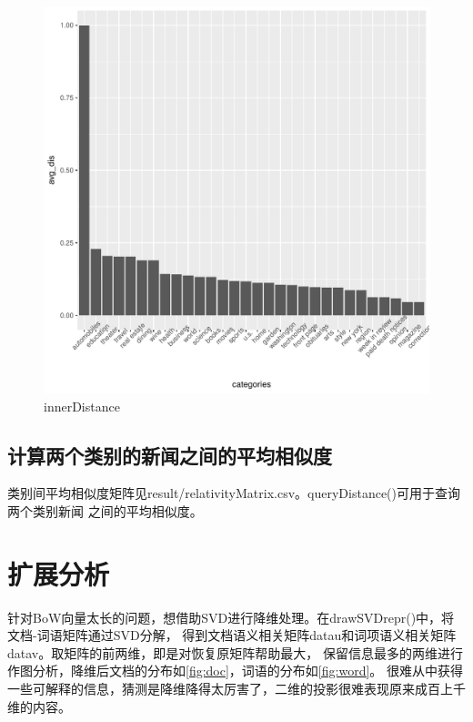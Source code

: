 \documentclass[12pt]{article}
\begin{document}
\begin{figure}[htbp]
\centering
\includegraphics[width=1.0\textwidth]{../result/innerDistance.pdf}
\caption{innerDistance}
\label{fig:innerDistance}
\end{figure}

\subsection{计算两个类别的新闻之间的平均相似度}
类别间平均相似度矩阵见result/relativityMatrix.csv。queryDistance()可用于查询两个类别新闻
之间的平均相似度。

\section{扩展分析}
针对BoW向量太长的问题，想借助SVD进行降维处理。在drawSVDrepr()中，将文档-词语矩阵通过SVD分解，
得到文档语义相关矩阵datau和词项语义相关矩阵datav。取矩阵的前两维，即是对恢复原矩阵帮助最大，
保留信息最多的两维进行作图分析，降维后文档的分布如\ref{fig:doc}，词语的分布如\ref{fig:word}。
很难从中获得一些可解释的信息，猜测是降维降得太厉害了，二维的投影很难表现原来成百上千维的内容。
\end{document}
